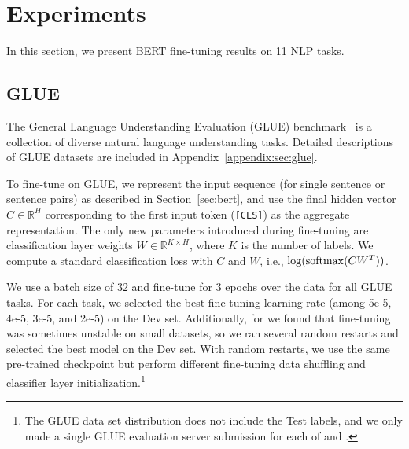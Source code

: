 
\section{Experiments}
\label{sec:experiments}

In this section, we present BERT fine-tuning results on 11 NLP tasks. 

\subsection{GLUE}
\label{sec:glue}

The General Language Understanding Evaluation (GLUE) benchmark~\cite{wang-etal:2018:_glue} is a collection of diverse natural language understanding tasks.
Detailed descriptions of GLUE datasets are included in Appendix~\ref{appendix:sec:glue}.

To fine-tune on GLUE, we represent the input sequence (for single sentence or sentence pairs) as described in Section~\ref{sec:bert}, and use the final hidden vector $C \in \mathbb{R}^{H}$ corresponding to the first input token ({\tt [CLS]}) as the aggregate representation.
The only new parameters introduced during fine-tuning are  classification layer weights $W \in \mathbb{R}^{K \times H}$, where $K$ is the number of labels. We compute a standard classification loss with $C$ and $W$, i.e., $\log({\rm softmax}(CW^T))$.

We use a batch size of 32 and fine-tune for 3 epochs over the data for all GLUE tasks. For each task, we selected the best fine-tuning learning rate (among 5e-5, 4e-5, 3e-5, and 2e-5) on the Dev set. Additionally, for \bertlarge we found that fine-tuning was sometimes unstable on small datasets, so we ran several random restarts and selected the best model on the Dev set. With random restarts, we use the same pre-trained checkpoint but perform different fine-tuning data shuffling and classifier layer initialization.\footnote{The GLUE data set distribution does not include the Test labels, and we only made a single GLUE evaluation server submission for each of \bertbase and \bertlarge.}

